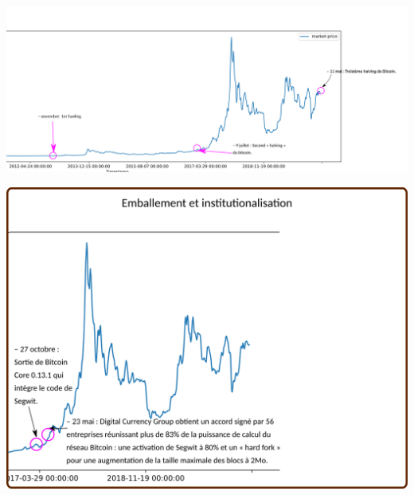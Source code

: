 \documentclass[presentation]{beamer}
\begin{document}
\begin{frame}[label={sec:orgc0aecf8}]{}
\begin{center}
\includegraphics[width=1.05\textwidth]{./Pictures/Timeline/62emballement_halvings.png}
\end{center}
\end{frame}

\begin{frame}[label={sec:orgfc05229}]{}
\begin{center}
\includegraphics[width=.95\textwidth]{./Pictures/Timeline/70emballement_segwit.png}
\end{center}
\end{frame}
\end{document}
